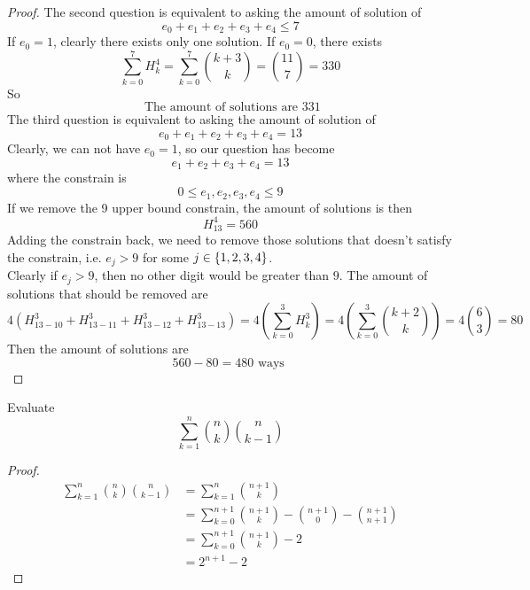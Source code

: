 \documentclass{report}
\begin{document}
\begin{proof}
The second question is equivalent to asking the amount of solution of 
\begin{equation*}
e_0+e_1+e_2+e_3+e_4\leq 7
\end{equation*}
If $e_0=1$, clearly there exists only one solution. If  $e_0=0$, there exists
\begin{equation*}
\sum_{k=0}^7 H^4_k=\sum_{k=0}^7 \binom{k+3}{k}=\binom{11}{7}=330
\end{equation*}
So 
\begin{equation*}
\text{ The amount of solutions are }331
\end{equation*}
The third question is equivalent to asking the amount of solution of 
\begin{equation*}
e_0+e_1+e_2+e_3+e_4=13
\end{equation*}
Clearly, we can not have $e_0=1$, so our question has become 
\begin{equation*}
e_1+e_2+e_3+e_4=13
\end{equation*}
where the constrain is 
\begin{equation*}
0\leq e_1,e_2,e_3,e_4\leq 9
\end{equation*}
If we remove the 9 upper bound constrain, the amount of solutions is then 
\begin{equation*}
H^4_{13}=560
\end{equation*}
Adding the constrain back, we need to remove those solutions that doesn't satisfy the constrain, i.e. $e_j>9$ for some  $j\in \{ 1,2,3,4 \}$.\\

Clearly if $e_j>9$, then no other digit would be greater than $9$. The amount of solutions that should be removed are
\begin{equation*}
4(H^3_{13-10}+H^3_{13-11}+H^3_{13-12}+H^3_{13-13})=4(\sum_{k=0}^3 H^3_k)=4(\sum_{k=0}^3 \binom{k+2}{k})=4\binom{6}{3}=80
\end{equation*}
Then the amount of solutions are 
\begin{equation*}
560-80=480\text{ ways }
\end{equation*}
\end{proof}
\begin{question}{}{}
Evaluate
\begin{equation*}
\sum_{k=1}^n \binom{n}{k}\binom{n}{k-1}
\end{equation*}
\end{question}
\begin{proof}
\begin{align*}
\sum_{k=1}^n \binom{n}{k}\binom{n}{k-1}&=\sum_{k=1}^n \binom{n+1}{k}\\
                                                    &=\sum_{k=0}^{n+1} \binom{n+1}{k}-\binom{n+1}{0}-\binom{n+1}{n+1}\\
                                                    &=\sum_{k=0}^{n+1} \binom{n+1}{k}-2\\
                                                    &=2^{n+1}-2
\end{align*}
\end{proof}
\end{document}
